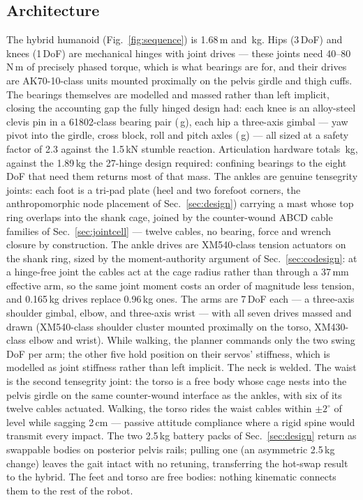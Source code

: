 \documentclass[conference]{IEEEtran}
\begin{document}
\subsection{Architecture}
The hybrid humanoid (Fig.~\ref{fig:sequence}) is 1.68\,m and
\hybridMass\,kg. Hips (3\,DoF) and knees (1\,DoF) are mechanical hinges with
joint drives --- these joints need 40--80\,N\,m of precisely phased torque,
which is what bearings are for, and their drives are AK70-10-class units
mounted proximally on the pelvis girdle and thigh cuffs. The bearings
themselves are modelled and massed rather than left implicit, closing the
accounting gap the fully hinged design had: each knee is an alloy-steel
clevis pin in a 61802-class bearing pair (\hybridKneeHw\,g), each hip a
three-axis gimbal --- yaw pivot into the girdle, cross block, roll and pitch
axles (\hybridHipHw\,g) --- all sized at a safety factor of 2.3 against the
1.5\,kN stumble reaction. Articulation hardware totals \hybridJointHw\,kg,
against the 1.89\,kg the 27-hinge design required: confining bearings to the
eight DoF that need them returns most of that mass. The ankles are
genuine tensegrity joints: each foot is a tri-pad plate (heel and two
forefoot corners, the anthropomorphic node placement of
Sec.~\ref{sec:design}) carrying a mast whose top ring overlaps into the shank
cage, joined by the counter-wound ABCD cable families of
Sec.~\ref{sec:jointcell} --- twelve cables, no bearing, force and wrench
closure by construction. The ankle drives are XM540-class tension actuators
on the shank ring, sized by the moment-authority argument of
Sec.~\ref{sec:codesign}: at a hinge-free joint the cables act at the cage
radius rather than through a 37\,mm effective arm, so the same joint moment
costs an order of magnitude less tension, and 0.165\,kg drives replace
0.96\,kg ones. The arms are 7\,DoF each --- a three-axis shoulder gimbal, elbow, and
three-axis wrist --- with all seven drives massed and drawn (XM540-class
shoulder cluster mounted proximally on the torso, XM430-class elbow and
wrist). While walking, the planner commands only the two swing DoF per arm;
the other five hold position on their servos' stiffness, which is modelled as
joint stiffness rather than left implicit. The neck is welded. The waist is the second tensegrity joint: the torso is a free body
whose cage nests into the pelvis girdle on the same counter-wound interface
as the ankles, with six of its twelve cables actuated. Walking, the torso
rides the waist cables within $\pm2^\circ$ of level while sagging 2\,cm ---
passive attitude compliance where a rigid spine would transmit every impact.
The two 2.5\,kg battery packs of Sec.~\ref{sec:design} return as swappable
bodies on posterior pelvis rails; pulling one (an asymmetric 2.5\,kg change)
leaves the gait intact with no retuning, transferring the hot-swap result to
the hybrid. The feet and torso are free bodies: nothing kinematic connects
them to the rest of the robot.
\end{document}
